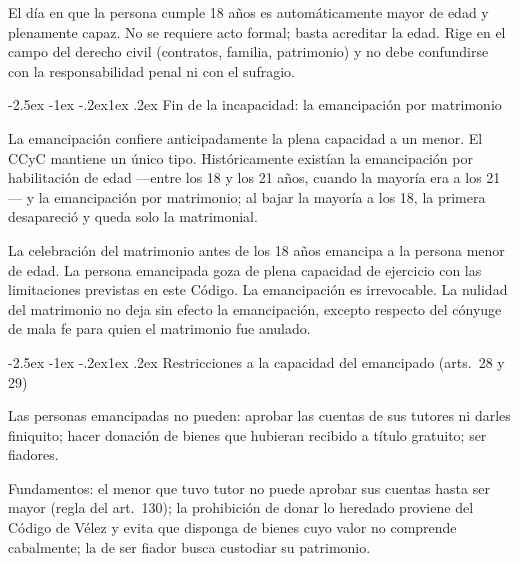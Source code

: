 \documentclass[12pt,oneside]{book}
\makeatletter
\renewcommand\subsection{\@startsection{subsection}{2}{\z@}%
  {-2.5ex \@plus -1ex \@minus -.2ex}{1ex \@plus .2ex}%
  {\normalfont\normalsize\bfseries}}
\makeatother
\begin{document}
\begin{importante}
El día en que la persona cumple 18 años es automáticamente mayor de edad y plenamente capaz. No se requiere acto formal; basta acreditar la edad. Rige en el campo del derecho civil (contratos, familia, patrimonio) y no debe confundirse con la responsabilidad penal ni con el sufragio.
\end{importante}

\subsection{Fin de la incapacidad: la emancipación por matrimonio}

La emancipación confiere anticipadamente la plena capacidad a un menor. El CCyC mantiene un único tipo. Históricamente existían la emancipación por habilitación de edad ---entre los 18 y los 21 años, cuando la mayoría era a los 21--- y la emancipación por matrimonio; al bajar la mayoría a los 18, la primera desapareció y queda solo la matrimonial.

\begin{regla}
La celebración del matrimonio antes de los 18 años emancipa a la persona menor de edad. La persona emancipada goza de plena capacidad de ejercicio con las limitaciones previstas en este Código. La emancipación es irrevocable. La nulidad del matrimonio no deja sin efecto la emancipación, excepto respecto del cónyuge de mala fe para quien el matrimonio fue anulado.
\end{regla}

\subsection{Restricciones a la capacidad del emancipado (arts.~28 y 29)}

\begin{regla}
Las personas emancipadas no pueden: aprobar las cuentas de sus tutores ni darles finiquito; hacer donación de bienes que hubieran recibido a título gratuito; ser fiadores.
\end{regla}

Fundamentos: el menor que tuvo tutor no puede aprobar sus cuentas hasta ser mayor (regla del art.~130); la prohibición de donar lo heredado proviene del Código de Vélez y evita que disponga de bienes cuyo valor no comprende cabalmente; la de ser fiador busca custodiar su patrimonio.
\end{document}
